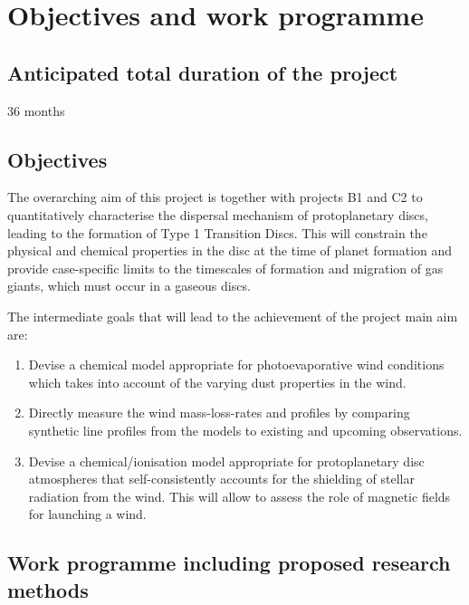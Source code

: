 \documentclass[10pt,fleqn,twoside]{article}
\begin{document}
\section{Objectives and work programme}
\renewcommand{\leftmark}{\sc Objectives and work programme}

\subsection{Anticipated total duration of the project}

36 months

\subsection{Objectives}

The overarching aim of this project is together with projects B1 and C2 to quantitatively characterise the dispersal mechanism of protoplanetary discs, leading to the formation of Type 1 Transition Discs. This will constrain the physical and chemical properties in the disc at the time of planet formation and provide case-specific limits to the timescales of formation and migration of gas giants, which must occur in a gaseous discs. 

The intermediate goals that will lead to the achievement of the project main aim are: 

\begin{enumerate}

\item Devise a chemical model appropriate for photoevaporative wind conditions which takes into account of the varying dust properties in the wind. 
\item Directly measure the wind mass-loss-rates and profiles by
  comparing synthetic line profiles from the models to existing and upcoming observations.
\item Devise a chemical/ionisation model appropriate for
  protoplanetary disc atmospheres that self-consistently accounts for
  the shielding of stellar radiation from the wind. This will allow to
  assess the role of magnetic fields for launching a wind.
\end{enumerate}

\subsection{Work programme including proposed research methods}
\end{document}
